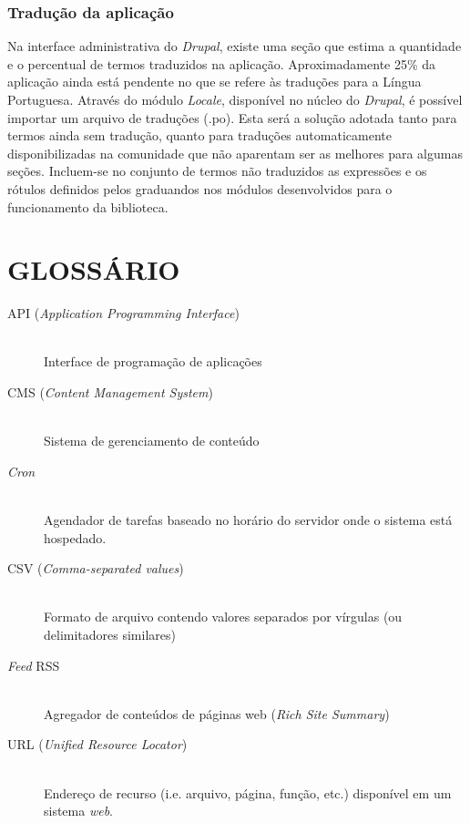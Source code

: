 \documentclass[a4paper]{article}
\begin{document}
\subsubsection{Tradução da aplicação}

Na interface administrativa do \textit{Drupal}, existe uma seção que estima a quantidade e o percentual de termos traduzidos na aplicação. Aproximadamente 25\% da aplicação ainda está pendente no que se refere às traduções para a Língua Portuguesa.
Através do módulo \textit{Locale}, disponível no núcleo do \textit{Drupal}, é possível importar um arquivo de traduções (.po). Esta será a solução adotada tanto para termos ainda sem tradução, quanto para traduções automaticamente disponibilizadas na comunidade que não aparentam ser as melhores para algumas seções. Incluem-se no conjunto de termos não traduzidos as expressões e os rótulos definidos pelos graduandos nos módulos desenvolvidos para o funcionamento da biblioteca.










\pagebreak
\section{GLOSSÁRIO}
\begin{description}
\item[API (\textit{Application Programming Interface})] \hfill \\ Interface de programação de aplicações
\item[CMS (\textit{Content Management System})] \hfill \\ Sistema de gerenciamento de conteúdo
\item[\textit{Cron}] \hfill \\ Agendador de tarefas baseado no horário do servidor onde o sistema está hospedado.
\item[CSV (\textit{Comma-separated values})] \hfill \\ Formato de arquivo contendo valores separados por vírgulas (ou delimitadores similares)
\item[\textit{Feed} RSS] \hfill \\ Agregador de conteúdos de páginas web (\textit{Rich Site Summary})
\item[URL (\textit{Unified Resource Locator})] \hfill \\ Endereço de recurso (i.e. arquivo, página, função, etc.) disponível em um sistema \textit{web}.
\end{description}
\end{document}
